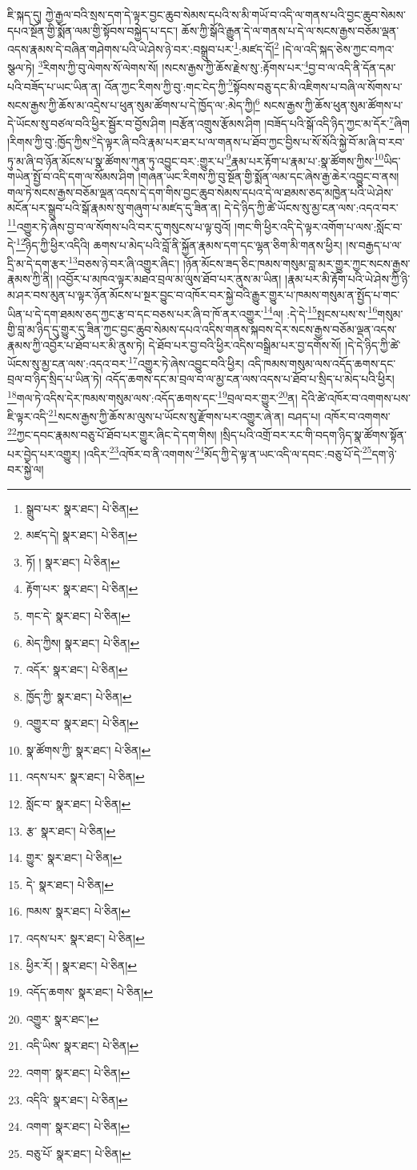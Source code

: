 ཇི་སྐད་དུ། ཀྱེ་རྒྱལ་བའི་སྲས་དག་དེ་ལྟར་བྱང་ཆུབ་སེམས་དཔའི་ས་མི་གཡོ་བ་འདི་ལ་གནས་པའི་བྱང་ཆུབ་སེམས་དཔའ་སྔོན་གྱི་སྨོན་ལམ་གྱི་སྟོབས་བསྐྱེད་པ་དང་། ཆོས་ཀྱི་སྒོའི་རྒྱུན་དེ་ལ་གནས་པ་དེ་ལ་སངས་རྒྱས་བཅོམ་ལྡན་འདས་རྣམས་དེ་བཞིན་གཤེགས་པའི་ཡེ་ཤེས་ཉེ་བར་:བསྒྲུབ་པར་\footnote{སྒྲུབ་པར་  སྣར་ཐང་།  པེ་ཅིན། }:མཛད་དོ།\footnote{མཛད་དེ།  སྣར་ཐང་།  པེ་ཅིན། } །དེ་ལ་འདི་སྐད་ཅེས་ཀྱང་བཀའ་སྩལ་ཏེ། \footnote{ཏོ། །   སྣར་ཐང་།  པེ་ཅིན། }རིགས་ཀྱི་བུ་ལེགས་སོ་ལེགས་སོ། །སངས་རྒྱས་ཀྱི་ཆོས་རྗེས་སུ་:རྟོགས་པར་\footnote{རྟོག་པར་  སྣར་ཐང་།  པེ་ཅིན། }བྱ་བ་ལ་འདི་ནི་དོན་དམ་པའི་བཟོད་པ་ཡང་ཡིན་ན། འོན་ཀྱང་རིགས་ཀྱི་བུ་:གང་ངེད་ཀྱི་\footnote{གང་དེ་  སྣར་ཐང་།  པེ་ཅིན། }སྟོབས་བཅུ་དང་མི་འཇིགས་པ་བཞི་ལ་སོགས་པ་སངས་རྒྱས་ཀྱི་ཆོས་མ་འདྲེས་པ་ཕུན་སུམ་ཚོགས་པ་དེ་ཁྱོད་ལ་:མེད་ཀྱི།\footnote{མེད་ཀྱིས།  སྣར་ཐང་།  པེ་ཅིན། } སངས་རྒྱས་ཀྱི་ཆོས་ཕུན་སུམ་ཚོགས་པ་དེ་ཡོངས་སུ་བཙལ་བའི་ཕྱིར་སྦྱོར་བ་བྱོས་ཤིག །བརྩོན་འགྲུས་རྩོམས་ཤིག །བཟོད་པའི་སྒོ་འདི་ཉིད་ཀྱང་མ་དོར་\footnote{འདོར་  སྣར་ཐང་།  པེ་ཅིན། }ཞིག །རིགས་ཀྱི་བུ་:ཁྱོད་ཀྱིས་\footnote{ཁྱོད་ཀྱི་  སྣར་ཐང་།  པེ་ཅིན། }དེ་ལྟར་ཞི་བའི་རྣམ་པར་ཐར་པ་ལ་གནས་པ་ཐོབ་ཀྱང་བྱིས་པ་སོ་སོའི་སྐྱེ་བོ་མ་ཞི་བ་རབ་ཏུ་མ་ཞི་བ་ཉོན་མོངས་པ་སྣ་ཚོགས་ཀུན་ཏུ་འབྱུང་བར་:གྱུར་པ་\footnote{འགྱུར་བ་  སྣར་ཐང་།  པེ་ཅིན། }རྣམ་པར་རྟོག་པ་རྣམ་པ་:སྣ་ཚོགས་ཀྱིས་\footnote{སྣ་ཚོགས་ཀྱི་  སྣར་ཐང་།  པེ་ཅིན། }ཡིད་གཡེན་སྤྱོ་བ་འདི་དག་ལ་སོམས་ཤིག །གཞན་ཡང་རིགས་ཀྱི་བུ་སྔོན་གྱི་སྨོན་ལམ་དང་ཞེས་རྒྱ་ཆེར་འབྱུང་བ་ནས། གལ་ཏེ་སངས་རྒྱས་བཅོམ་ལྡན་འདས་དེ་དག་གིས་བྱང་ཆུབ་སེམས་དཔའ་དེ་ལ་ཐམས་ཅད་མཁྱེན་པའི་ཡེ་ཤེས་མངོན་པར་སྒྲུབ་པའི་སྒོ་རྣམས་སུ་གཞུག་པ་མཛད་དུ་ཟིན་ན། དེ་དེ་ཉིད་ཀྱི་ཚེ་ཡོངས་སུ་མྱ་ངན་ལས་:འདའ་བར་\footnote{འདས་པར་  སྣར་ཐང་།  པེ་ཅིན། }འགྱུར་ཏེ་ཞེས་བྱ་བ་ལ་སོགས་པའི་བར་དུ་གསུངས་པ་ལྟ་བུའོ། །གང་གི་ཕྱིར་འདི་དེ་ལྟར་འགོག་པ་ལས་:སློང་བ་དེ་\footnote{སློང་བ་  སྣར་ཐང་།  པེ་ཅིན། }ཉིད་ཀྱི་ཕྱིར་འདིའི། ཆགས་པ་མེད་པའི་བློ་ནི་སྐྱོན་རྣམས་དག་དང་ལྷན་ཅིག་མི་གནས་ཕྱིར། །ས་བརྒྱད་པ་ལ་དྲི་མ་དེ་དག་རྩར་\footnote{རྩ་  སྣར་ཐང་།  པེ་ཅིན། }བཅས་ཉེ་བར་ཞི་འགྱུར་ཞིང་། །ཉོན་མོངས་ཟད་ཅིང་ཁམས་གསུམ་བླ་མར་གྱུར་ཀྱང་སངས་རྒྱས་རྣམས་ཀྱི་ནི། །འབྱོར་པ་མཁའ་ལྟར་མཐའ་བྲལ་མ་ལུས་ཐོབ་པར་ནུས་མ་ཡིན། །རྣམ་པར་མི་རྟོག་པའི་ཡེ་ཤེས་ཀྱི་ཉི་མ་ཤར་བས་མུན་པ་ལྟར་ཉོན་མོངས་པ་སྔར་བྱུང་བ་འཁོར་བར་སྐྱེ་བའི་རྒྱུར་གྱུར་པ་ཁམས་གསུམ་ན་སྤྱོད་པ་གང་ཡིན་པ་དེ་དག་ཐམས་ཅད་ཀྱང་རྩ་བ་དང་བཅས་པར་ཞི་བ་ཁོ་ནར་འགྱུར་\footnote{གྱུར་  སྣར་ཐང་།  པེ་ཅིན། }ལ། :དེ་དེ་\footnote{དེ་  སྣར་ཐང་།  པེ་ཅིན། }སྤངས་པས་ས་\footnote{ཁམས་  སྣར་ཐང་།  པེ་ཅིན། }གསུམ་གྱི་བླ་མ་ཉིད་དུ་གྱུར་དུ་ཟིན་ཀྱང་བྱང་ཆུབ་སེམས་དཔའ་འདིས་གནས་སྐབས་དེར་སངས་རྒྱས་བཅོམ་ལྡན་འདས་རྣམས་ཀྱི་འབྱོར་པ་ཐོབ་པར་མི་ནུས་ཏེ། དེ་ཐོབ་པར་བྱ་བའི་ཕྱིར་འདིས་བསྒྲིམ་པར་བྱ་དགོས་སོ། །དེ་དེ་ཉིད་ཀྱི་ཚེ་ཡོངས་སུ་མྱ་ངན་ལས་:འདའ་བར་\footnote{འདས་པར་  སྣར་ཐང་།  པེ་ཅིན། }འགྱུར་ཏེ་ཞེས་འབྱུང་བའི་ཕྱིར། འདི་ཁམས་གསུམ་ལས་འདོད་ཆགས་དང་བྲལ་བ་ཉིད་སྲིད་པ་ཡིན་ཏེ། འདོད་ཆགས་དང་མ་བྲལ་བ་ལ་མྱ་ངན་ལས་འདས་པ་ཐོབ་པ་སྲིད་པ་མེད་པའི་ཕྱིར། \footnote{ཕྱིར་རོ། །   སྣར་ཐང་།  པེ་ཅིན། }གལ་ཏེ་འདིས་དེར་ཁམས་གསུམ་ལས་:འདོད་ཆགས་དང་\footnote{འདོད་ཆགས་  སྣར་ཐང་།  པེ་ཅིན། }བྲལ་བར་གྱུར་\footnote{འགྱུར་  སྣར་ཐང་། }ན། དེའི་ཚེ་འཁོར་བ་འགགས་པས་ཇི་ལྟར་འདི་\footnote{འདི་ཡིས་  སྣར་ཐང་།  པེ་ཅིན། }སངས་རྒྱས་ཀྱི་ཆོས་མ་ལུས་པ་ཡོངས་སུ་རྫོགས་པར་འགྱུར་ཞེ་ན། བཤད་པ། འཁོར་བ་འགགས་\footnote{འགག་  སྣར་ཐང་།  པེ་ཅིན། }ཀྱང་དབང་རྣམས་བཅུ་པོ་ཐོབ་པར་གྱུར་ཞིང་དེ་དག་གིས། །སྲིད་པའི་འགྲོ་བར་རང་གི་བདག་ཉིད་སྣ་ཚོགས་སྟོན་པར་བྱེད་པར་འགྱུར། །འདིར་\footnote{འདིའི་  སྣར་ཐང་།  པེ་ཅིན། }འཁོར་བ་ནི་འགགས་\footnote{འགག་  སྣར་ཐང་།  པེ་ཅིན། }མོད་ཀྱི་དེ་ལྟ་ན་ཡང་འདི་ལ་དབང་:བཅུ་པོ་དེ་\footnote{བཅུ་པོ་  སྣར་ཐང་།  པེ་ཅིན། }དག་ཉེ་བར་སྐྱེ་ལ། 
